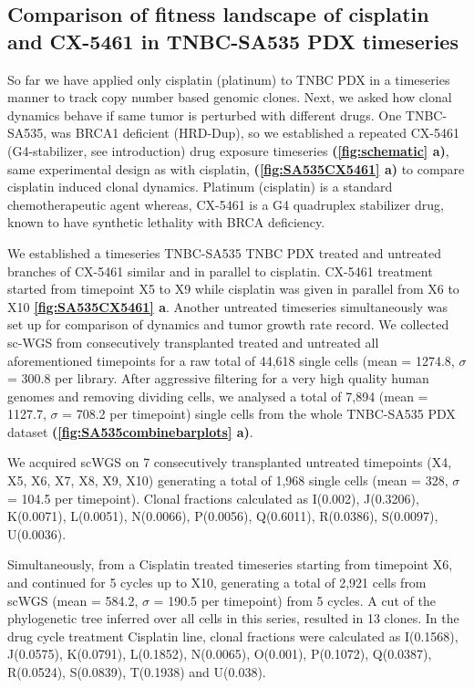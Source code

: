 
\subsection{Comparison of fitness landscape of cisplatin and CX-5461 in TNBC-SA535 PDX timeseries}
So far we have applied only cisplatin (platinum) to TNBC PDX in a timeseries manner to track copy number based genomic clones. Next, we asked how clonal dynamics behave if same tumor is perturbed with different drugs. 
One TNBC-SA535, was BRCA1 deficient (HRD-Dup), so we established a repeated CX-5461 (G4-stabilizer, see introduction) drug exposure timeseries \textbf{(\autoref{fig:schematic} a)}, same experimental design as with cisplatin, \textbf{(\autoref{fig:SA535CX5461} a)} to compare cisplatin induced clonal dynamics. Platinum (cisplatin) is a standard chemotherapeutic agent whereas, CX-5461 is a G4 quadruplex stabilizer drug, known to have synthetic lethality with BRCA deficiency.

We established a timeseries TNBC-SA535 TNBC PDX treated and untreated branches of CX-5461 similar and in parallel to cisplatin.
 CX-5461 treatment started from timepoint X5 to X9 while cisplatin was given in parallel from X6 to X10 \textbf{\autoref{fig:SA535CX5461} a}. Another untreated timeseries simultaneously was set up for comparison of dynamics and tumor growth rate record.
We collected sc-WGS from consecutively transplanted treated and untreated all aforementioned timepoints for a raw total of 44,618 single cells (mean = 1274.8, $\sigma$ = 300.8 per library. After aggressive filtering for a very high quality human genomes and removing dividing cells, we analysed a total of 7,894 (mean = 1127.7, $\sigma$ = 708.2 per timepoint) single cells from the whole TNBC-SA535 PDX dataset \textbf{(\autoref{fig:SA535combinebarplots} a)}.

We acquired scWGS on 7 consecutively transplanted untreated timepoints (X4, X5, X6, X7, X8, X9, X10) generating a total of 1,968 single cells (mean = 328, $\sigma$ = 104.5 per timepoint).
Clonal fractions calculated as I(0.002), J(0.3206), K(0.0071), L(0.0051), N(0.0066), P(0.0056), Q(0.6011), R(0.0386), S(0.0097), U(0.0036). 

Simultaneously, from a Cisplatin treated timeseries starting from timepoint X6, and continued for 5 cycles up to X10, generating a total of 2,921 cells from scWGS (mean = 584.2, $\sigma$ = 190.5 per timepoint) from 5 cycles. A cut of the phylogenetic tree inferred over all cells in this series, resulted in 13 clones.
In the drug cycle treatment Cisplatin line, clonal fractions were
calculated as I(0.1568), J(0.0575), K(0.0791), L(0.1852), N(0.0065), O(0.001), P(0.1072), Q(0.0387), R(0.0524), S(0.0839), T(0.1938) and U(0.038).

